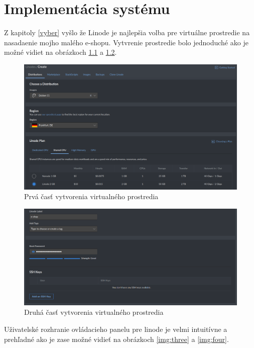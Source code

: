 \chapter{Implementácia systému}

Z kapitoly \ref{vyber} vyšlo že Linode je najlepšia volba pre virtuálne prostredie na nasadaenie mojho malého e-shopu. Vytvrenie prostredie bolo jednoduché ako je možné vidiet na obrázkoch \ref{img:one} a \ref{img:two}.

\begin{figure}[ht!]
  \includegraphics[width=\linewidth]{images/1.png}
  \caption{Prvá časť vytvorenia virtualného prostredia}
  \label{img:one}
\end{figure}

\begin{figure}[ht!]
  \includegraphics[width=\linewidth]{images/2.png}
  \caption{Druhá časť vytvorenia virtualného prostredia}
  \label{img:two}
\end{figure}

\noindent Uživatelské rozhranie ovládacieho panelu pre linode je velmi intuitívne a prehľadné ako je zase možné vidieť na obrázkoch \ref{img:three} a \ref{img:four}.

